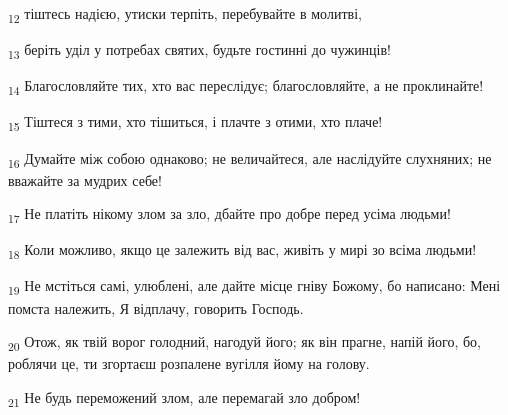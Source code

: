\begin{tcolorbox}
\textsubscript{12} тіштесь надією, утиски терпіть, перебувайте в молитві,
\end{tcolorbox}
\begin{tcolorbox}
\textsubscript{13} беріть уділ у потребах святих, будьте гостинні до чужинців!
\end{tcolorbox}
\begin{tcolorbox}
\textsubscript{14} Благословляйте тих, хто вас переслідує; благословляйте, а не проклинайте!
\end{tcolorbox}
\begin{tcolorbox}
\textsubscript{15} Тіштеся з тими, хто тішиться, і плачте з отими, хто плаче!
\end{tcolorbox}
\begin{tcolorbox}
\textsubscript{16} Думайте між собою однаково; не величайтеся, але наслідуйте слухняних; не вважайте за мудрих себе!
\end{tcolorbox}
\begin{tcolorbox}
\textsubscript{17} Не платіть нікому злом за зло, дбайте про добре перед усіма людьми!
\end{tcolorbox}
\begin{tcolorbox}
\textsubscript{18} Коли можливо, якщо це залежить від вас, живіть у мирі зо всіма людьми!
\end{tcolorbox}
\begin{tcolorbox}
\textsubscript{19} Не мстіться самі, улюблені, але дайте місце гніву Божому, бо написано: Мені помста належить, Я відплачу, говорить Господь.
\end{tcolorbox}
\begin{tcolorbox}
\textsubscript{20} Отож, як твій ворог голодний, нагодуй його; як він прагне, напій його, бо, роблячи це, ти згортаєш розпалене вугілля йому на голову.
\end{tcolorbox}
\begin{tcolorbox}
\textsubscript{21} Не будь переможений злом, але перемагай зло добром!
\end{tcolorbox}

